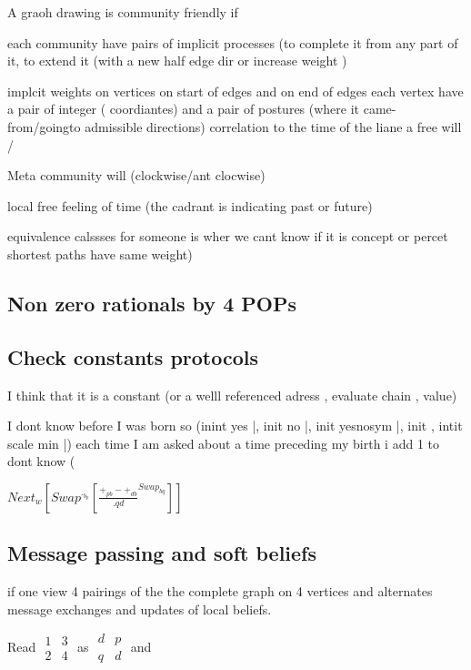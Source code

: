 \documentclass{article}
\begin{document}
A graoh drawing is community friendly if

each community have  pairs of  implicit processes (to complete it from any part of it, to extend it (with a new half edge dir or increase weight )

implcit weights on vertices on start of edges and on end of edges
each vertex have a pair of integer ( coordiantes) and a pair of  postures (where it came-from/goingto admissible directions)
correlation to the time of the liane a free will / 

Meta  community will (clockwise/ant clocwise)

local free feeling of time (the cadrant is indicating past or future)

equivalence calssses for someone is wher we cant know if it is concept or percet  shortest paths have same weight)

\subsection{Non zero rationals by  4 POPs}

\subsection{Check constants protocols}
I think that it is a constant (or a welll referenced adress ,  evaluate chain , value) 

I dont know before I was born so 
(inint yes |,
 init no |,
  init yesnosym |,
   init , intit scale min |)
   each time I am asked about a time preceding my birth i add 1 to dont know (
   
$Next_w [   Swap^{._{b_p}} [ {\frac {+_{pb}- +_{db}}{.qd} }^{Swap_{bq}}]] $
   
   

\subsection{Message passing and soft beliefs}

if one view 4 pairings of the the complete graph on 4 vertices and alternates message exchanges and updates of local beliefs.

Read  $\begin{matrix} 1&3 \\2 &4\end{matrix} $ as
$ \begin{matrix} d&p \\ q&d\end{matrix}$ and 
\end{document}
